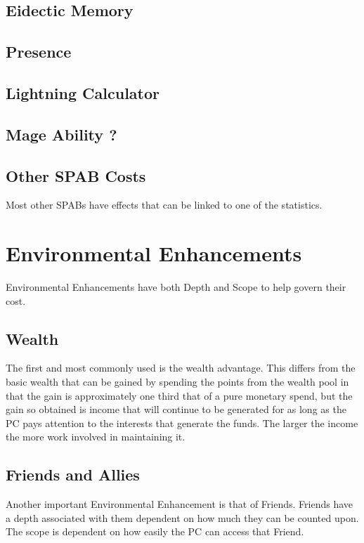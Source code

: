 \subsection{Eidectic Memory}
\subsection{Presence}
\subsection{Lightning Calculator}
\subsection{Mage Ability ?}
\subsection{Other SPAB Costs}

Most other SPABs have effects that can be linked to one of the
statistics. 

\section{Environmental Enhancements}

Environmental Enhancements have both Depth and Scope to help govern 
their cost. 

\subsection{Wealth}

The first and most commonly used is the wealth advantage. This differs
from the basic wealth that can be gained by spending the points from the
wealth pool in that the gain is approximately one third that of a pure
monetary spend, but the gain so obtained is income that will continue to
be generated for as long as the PC pays attention to the interests that
generate the funds. The larger the income the more work involved in
maintaining it. 

\subsection{Friends and Allies}

Another important Environmental Enhancement is that of Friends. Friends
have a depth associated with them dependent on how much they can be
counted upon. The scope is dependent on how easily the PC can access
that Friend. 

